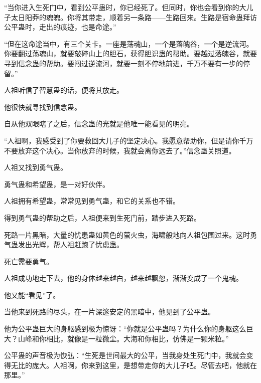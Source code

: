 \begin{this_body}
“当你进入生死门中，看到公平蛊时，你已经死了。但同时，你也会看到你的大儿子太日阳莽的魂魄。你将其带走，顺着另一条路——生路回来。生路是宿命蛊拜访公平蛊时，走出的痕迹，也是命途。”

“但在这命途当中，有三个关卡。一座是荡魂山，一个是落魄谷，一个是逆流河。你要翻过荡魂山，就要敲碎山上的胆石，获得胆识蛊的帮助。要越过落魄谷，就要寻到信念蛊的帮助。要闯过逆流河，就要一刻不停地前进，千万不要有一步的停留。”

人祖听信了智慧蛊的话，便将其放走。

他很快就寻找到信念蛊。

自从他双眼瞎了之后，信念蛊的光就是他唯一能看见的明亮。

“人祖啊，我感受到了你要救回大儿子的坚定决心。我愿意帮助你，但是请你千万不要放弃这个决心。当你放弃的时候，我就会离你远去了。”信念蛊关照道。

人祖又找到勇气蛊。

勇气蛊和希望蛊，是一对好伙伴。

人祖拥有希望蛊，常常见到勇气蛊，和它的关系也不错。

得到勇气蛊的帮助之后，人祖便来到生死门前，踏步进入死路。

死路一片黑暗，大量的忧患蛊如黄色的萤火虫，海啸般地向人祖包围过来。这时勇气蛊发出光辉，帮人祖赶跑了忧虑蛊。

死亡需要勇气。

人祖成功地走下去，他的身体越来越白，越来越飘忽，渐渐变成了一个鬼魂。

他又能“看见”了。

当他来到死路的尽头，在一片深邃安定的黑暗中，他见到了公平蛊。

他为公平蛊巨大的身躯感到极为惊讶：“你就是公平蛊吗？为什么你的身躯这么巨大？山峰和你相比，就像是一粒微尘。大海和你相比，仿佛是一颗米粒。”

公平蛊的声音极为恢弘：“生死是世间最大的公平，当我身处生死门中，我就会变得无比的庞大。人祖啊，你来到这里，是想带走你的大儿子吧。尽管去吧，他就在那里。”

\end{this_body}

